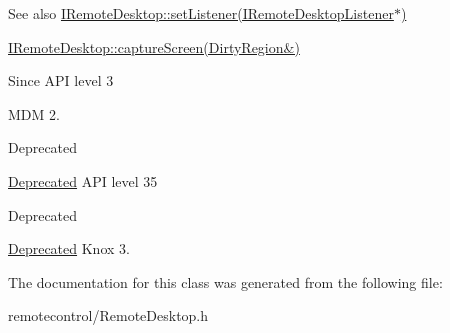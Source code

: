 \begin{DoxySeeAlso}{\-See also}
\hyperlink{classknoxremotedesktop_1_1IRemoteDesktop_af22e75002f52d837cfc9d9589647ddb9}{\-I\-Remote\-Desktop\-::set\-Listener(\-I\-Remote\-Desktop\-Listener$\ast$)}

\hyperlink{classknoxremotedesktop_1_1IRemoteDesktop_a0ab5a0cf162a91c5e69abeed90f8ba09}{\-I\-Remote\-Desktop\-::capture\-Screen(\-Dirty\-Region\&)}
\end{DoxySeeAlso}
\begin{DoxySince}{\-Since}
\-A\-P\-I level 3

\-M\-D\-M 2.
\end{DoxySince}
\begin{DoxyRefDesc}{\-Deprecated}
\item[\hyperlink{deprecated__deprecated000015}{\-Deprecated}]\-A\-P\-I level 35\end{DoxyRefDesc}


\begin{DoxyRefDesc}{\-Deprecated}
\item[\hyperlink{deprecated__deprecated000016}{\-Deprecated}]\-Knox 3.\end{DoxyRefDesc}


\-The documentation for this class was generated from the following file\-:\begin{DoxyCompactItemize}
\item 
remotecontrol/\-Remote\-Desktop.\-h\end{DoxyCompactItemize}
